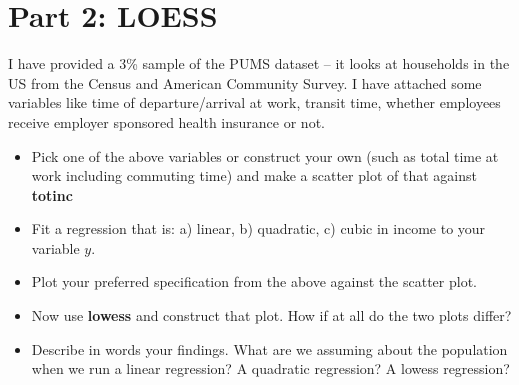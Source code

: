 \documentclass{article}
\begin{document}
\section*{Part 2: LOESS}
I have provided a 3\% sample of the PUMS dataset -- it looks at households in the US from the Census and American Community Survey.  I have attached some variables like time of departure/arrival at work, transit time, whether employees receive employer sponsored health insurance or not.
\begin{itemize}
\item Pick one of the above variables or construct your own (such as total time at work including commuting time) and make a scatter plot of that against \textbf{totinc}
\item Fit a regression that is: a) linear, b) quadratic, c) cubic in income to your variable $y$.
\item Plot your preferred specification from the above against the scatter plot.
\item Now use \textbf{lowess} and construct that plot. How if at all do the two plots differ?
\item Describe in words your findings. What are we assuming about the population when we run a linear regression? A quadratic regression? A lowess regression? 
\end{itemize}
\end{document}
